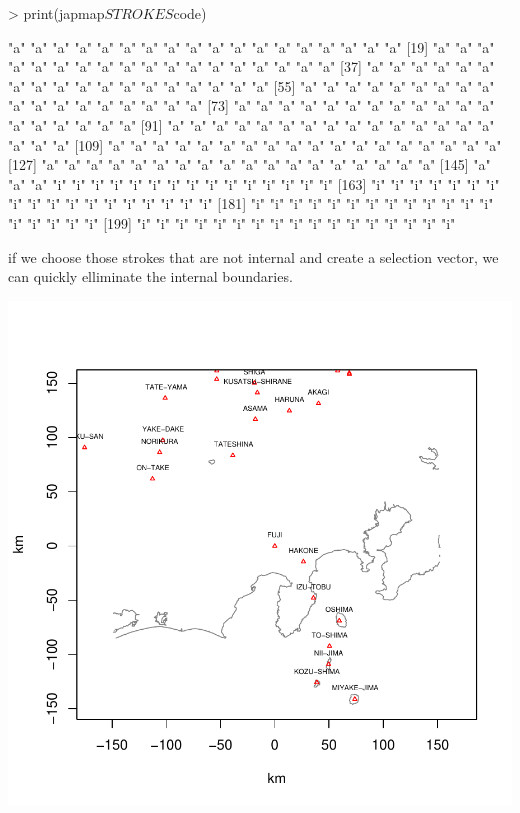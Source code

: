 \documentclass{article}
\begin{document}
\begin{Schunk}
\begin{Sinput}
> print(japmap$STROKES$code)
\end{Sinput}
\begin{Soutput}
  [1] "a" "a" "a" "a" "a" "a" "a" "a" "a" "a" "a" "a" "a" "a" "a" "a" "a" "a"
 [19] "a" "a" "a" "a" "a" "a" "a" "a" "a" "a" "a" "a" "a" "a" "a" "a" "a" "a"
 [37] "a" "a" "a" "a" "a" "a" "a" "a" "a" "a" "a" "a" "a" "a" "a" "a" "a" "a"
 [55] "a" "a" "a" "a" "a" "a" "a" "a" "a" "a" "a" "a" "a" "a" "a" "a" "a" "a"
 [73] "a" "a" "a" "a" "a" "a" "a" "a" "a" "a" "a" "a" "a" "a" "a" "a" "a" "a"
 [91] "a" "a" "a" "a" "a" "a" "a" "a" "a" "a" "a" "a" "a" "a" "a" "a" "a" "a"
[109] "a" "a" "a" "a" "a" "a" "a" "a" "a" "a" "a" "a" "a" "a" "a" "a" "a" "a"
[127] "a" "a" "a" "a" "a" "a" "a" "a" "a" "a" "a" "a" "a" "a" "a" "a" "a" "a"
[145] "a" "a" "a" "i" "i" "i" "i" "i" "i" "i" "i" "i" "i" "i" "i" "i" "i" "i"
[163] "i" "i" "i" "i" "i" "i" "i" "i" "i" "i" "i" "i" "i" "i" "i" "i" "i" "i"
[181] "i" "i" "i" "i" "i" "i" "i" "i" "i" "i" "i" "i" "i" "i" "i" "i" "i" "i"
[199] "i" "i" "i" "i" "i" "i" "i" "i" "i" "i" "i" "i" "i" "i" "i" "i" "i"
\end{Soutput}
\end{Schunk}

if we choose those strokes that are not internal 
and create a selection vector, we can quickly elliminate 
the internal boundaries.

\begin{Schunk}
\end{Schunk}
\includegraphics{gmap-014}
\end{document}
